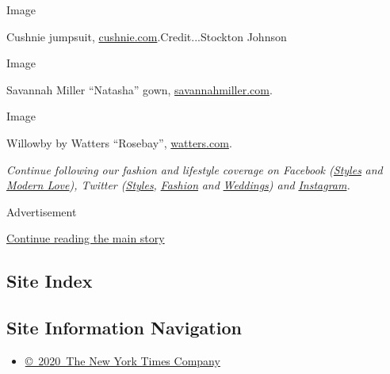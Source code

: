 Image

Cushnie jumpsuit,
\href{https://www.cushnie.com/pages/bridal}{cushnie.com}.Credit...Stockton
Johnson

Image

Savannah Miller ``Natasha'' gown,
\href{https://www.savannahmiller.com/}{savannahmiller.com}.

Image

Willowby by Watters ``Rosebay'',
\href{https://www.watters.com/willowby/products/rosebay}{watters.com}.

\emph{Continue following our fashion and lifestyle coverage on Facebook
(}\href{https://www.facebookcorewwwi.onion/nytimesstyles}{\emph{Styles}}
\emph{and}
\href{https://www.facebookcorewwwi.onion/modernlove}{\emph{Modern
Love}}\emph{), Twitter
(}\href{https://twitter.com/nytstyles}{\emph{Styles}}\emph{,}
\href{https://twitter.com/nytfashion}{\emph{Fashion}} \emph{and}
\href{https://twitter.com/nytimesvows}{\emph{Weddings}}\emph{) and}
\href{https://instagram.com/nytimesfashion}{\emph{Instagram}}\emph{.}

Advertisement

\protect\hyperlink{after-bottom}{Continue reading the main story}

\hypertarget{site-index}{%
\subsection{Site Index}\label{site-index}}

\hypertarget{site-information-navigation}{%
\subsection{Site Information
Navigation}\label{site-information-navigation}}

\begin{itemize}
\tightlist
\item
  \href{https://help.nytimes3xbfgragh.onion/hc/en-us/articles/115014792127-Copyright-notice}{©~2020~The
  New York Times Company}
\end{itemize}

